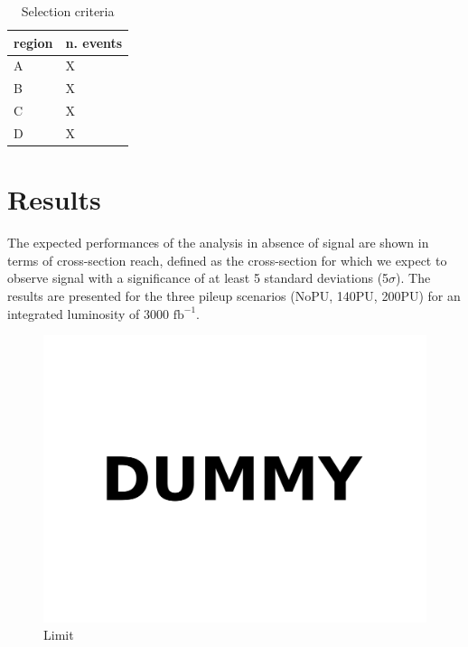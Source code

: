 \documentclass[11pt,twoside,a4paper]{article}
\begin{document}
\begin{table}
 \centering
 \caption{Selection criteria\label{tab:numbers}}
 \begin{tabular}{ll}
  \toprule
  region 	& n. events \\
  \midrule
  A		& X \\
  B		& X \\
  C		& X \\
  D		& X \\
  \bottomrule
 \end{tabular}
\end{table}

\section{Results}

The expected performances of the analysis in absence of signal are shown in terms of cross-section reach, defined as the cross-section for which we expect to observe signal with a significance of at least 5 standard deviations (5$\sigma$).
The results are presented for the three pileup scenarios (NoPU, 140PU, 200PU) for an integrated luminosity of 3000 $\mathrm{fb}^{-1}$.

\begin{figure}
\centering
\includegraphics[width=.5\textwidth]{figures/dummy.pdf}
\caption{Limit\label{fig:limit}}
\end{figure}
\end{document}
